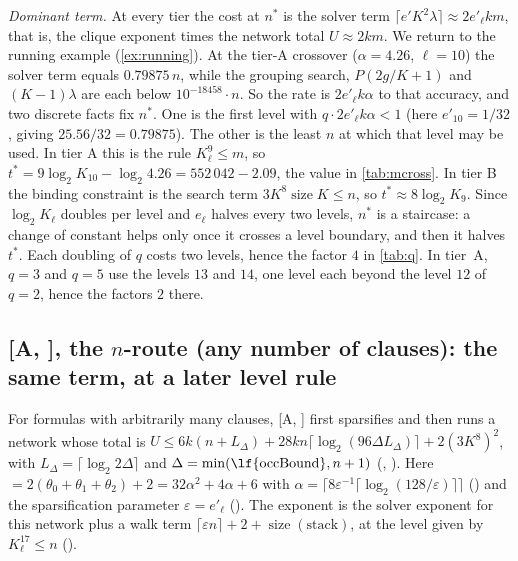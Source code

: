 \documentclass[10pt]{amsart}
\theoremstyle{definition}
\theoremstyle{remark}
\numberwithin{equation}{section}
\newcommand{\A}[1][]{\textup{[A\if\relax\detokenize{#1}\relax\else, #1\fi]}}
\newcommand{\tst}{t^{*}}
\newcommand{\nst}{n^{*}}
\newcommand{\sz}{\operatorname{size}}
\begin{document}
\emph{Dominant term.} At every tier the cost at $\nst$ is the solver term
$\lceil e'K^2\lambda\rceil\approx2e'_\ell km$, that is, the clique exponent times the network
total $U\approx2km$. We return to the running example (\cref{ex:running}). At the tier-A crossover
($\alpha=4.26$, $\ell=10$) the solver term equals $0.79875\,n$, while the grouping search,
$P(2g/K+1)$ and $(K-1)\lambda$ are each below $10^{-18458}\cdot n$. So the rate is $2e'_\ell k\alpha$
to that accuracy, and two discrete facts fix $\nst$. One is the first level with
$q\cdot2e'_\ell k\alpha<1$ (here $e'_{10}=1/32$, giving $25.56/32=0.79875$). The other is the least
$n$ at which that level may be used. In tier A this is the rule $K_\ell^9\le m$, so
$\tst=9\log_2K_{10}-\log_2 4.26=552\,042-2.09$, the value in \cref{tab:mcross}. In tier B the
binding constraint is the search term $3K^8\sz K\le n$, so $\tst\approx8\log_2K_9$. Since
$\log_2K_\ell$ doubles per level and $e_\ell$ halves every two levels, $\nst$ is a staircase: a
change of constant helps only once it crosses a level boundary, and then it halves $\tst$. Each
doubling of $q$ costs two levels, hence the factor $4$ in \cref{tab:q}. In tier~A, $q=3$ and $q=5$
use the levels $13$ and $14$, one level each beyond the level $12$ of $q=2$, hence the factors $2$
there.

\subsection{\texorpdfstring{\A}{[A]}, the \texorpdfstring{$n$}{n}-route (any number of clauses): the same term, at a later level rule}\label{sec:nroute}
For formulas with arbitrarily many clauses, \A{} first sparsifies and then runs a network whose
total is $U\le6k(n+L_\Delta)+28kn\lceil\log_2(96\Delta L_\Delta)\rceil+2(3K^8)^2$, with
$L_\Delta=\lceil\log_2 2\Delta\rceil$ and $\Delta=\min(\text{\lf{occBound}},n+1)$
(, ). Here
 $=2(\theta_0+\theta_1+\theta_2)+2=32\alpha^2+4\alpha+6$ with
$\alpha=\lceil8\varepsilon^{-1}\lceil\log_2(128/\varepsilon)\rceil\rceil$
() and the sparsification parameter
$\varepsilon=e'_\ell$ (). The exponent is the solver exponent for this network plus a walk
term $\lceil\varepsilon n\rceil+2+\sz(\text{stack})$, at the level given by $K_\ell^{17}\le n$
().
\end{document}

